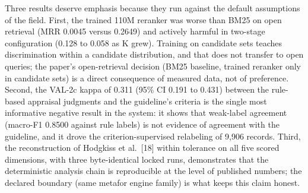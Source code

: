 \documentclass[
]{article}
\begin{document}
Three results deserve emphasis because they run against the default
assumptions of the field. First, the trained 110M reranker was worse
than BM25 on open retrieval (MRR 0.0045 versus 0.2649) and actively
harmful in two-stage configuration (0.128 to 0.058 as K grew). Training
on candidate sets teaches discrimination within a candidate
distribution, and that does not transfer to open queries; the paper's
open-retrieval decision (BM25 baseline, trained reranker only in
candidate sets) is a direct consequence of measured data, not of
preference. Second, the VAL-2c kappa of 0.311 (95\% CI 0.191 to 0.431)
between the rule-based appraisal judgments and the guideline's criteria
is the single most informative negative result in the system: it shows
that weak-label agreement (macro-F1 0.8500 against rule labels) is not
evidence of agreement with the guideline, and it drove the
criterion-supervised relabeling of 9,906 records. Third, the
reconstruction of Hodgkiss et al.~{[}18{]} within tolerance on all five
scored dimensions, with three byte-identical locked runs, demonstrates
that the deterministic analysis chain is reproducible at the level of
published numbers; the declared boundary (same metafor engine family) is
what keeps this claim honest.
\end{document}
